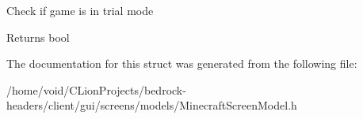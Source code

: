Check if game is in trial mode \begin{DoxyReturn}{Returns}
bool 
\end{DoxyReturn}


The documentation for this struct was generated from the following file\+:\begin{DoxyCompactItemize}
\item 
/home/void/\+C\+Lion\+Projects/bedrock-\/headers/client/gui/screens/models/Minecraft\+Screen\+Model.\+h\end{DoxyCompactItemize}
